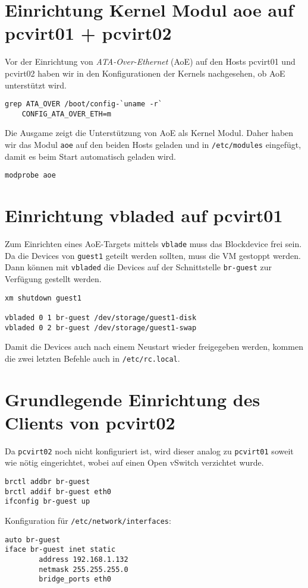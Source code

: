 \section{Einrichtung Kernel Modul aoe auf pcvirt01 + pcvirt02}
Vor der Einrichtung von \emph{ATA-Over-Ethernet} (AoE) \cite{hopkins2006aoe} auf den Hosts pcvirt01 und pcvirt02 haben wir in den Konfigurationen der Kernels nachgesehen, ob AoE unterstützt wird. 
\setupVerbatimOut
\begin{verbatim}
grep ATA_OVER /boot/config-`uname -r`
    CONFIG_ATA_OVER_ETH=m
\end{verbatim} 
Die Ausgame zeigt die Unterstützung von AoE als Kernel Modul. Daher haben wir das Modul \verb#aoe# auf den beiden Hosts geladen und  in \verb#/etc/modules# eingefügt, damit es beim Start automatisch geladen wird. 

\begin{verbatim} 
modprobe aoe
\end{verbatim}

\section{Einrichtung vbladed auf pcvirt01}
Zum Einrichten eines AoE-Targets mittels \verb#vblade# muss das Blockdevice frei sein. Da die Devices von \verb#guest1# geteilt werden sollten, muss die VM gestoppt werden. Dann können mit \verb#vbladed# die Devices auf der Schnittstelle \verb#br-guest# zur Verfügung gestellt werden. 
\setupVerbatimOut
\begin{verbatim}
xm shutdown guest1

vbladed 0 1 br-guest /dev/storage/guest1-disk  
vbladed 0 2 br-guest /dev/storage/guest1-swap
\end{verbatim}
Damit die Devices auch nach einem Neustart wieder freigegeben werden, kommen die zwei letzten Befehle auch in \verb#/etc/rc.local#. 
\section{Grundlegende Einrichtung des Clients von pcvirt02}
Da \verb#pcvirt02# noch nicht konfiguriert ist, wird dieser analog zu \verb#pcvirt01# soweit wie nötig eingerichtet, wobei auf einen Open vSwitch verzichtet wurde.
\begin{verbatim}
brctl addbr br-guest
brctl addif br-guest eth0
ifconfig br-guest up
\end{verbatim}
Konfiguration für \verb#/etc/network/interfaces#:
\setupVerbatimOut
\begin{verbatim}
auto br-guest
iface br-guest inet static
        address 192.168.1.132
        netmask 255.255.255.0
        bridge_ports eth0
\end{verbatim}

